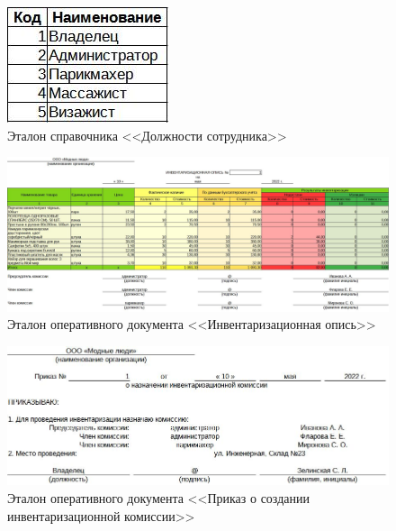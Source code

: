 \documentclass[12pt, a4paper, simple]{eskdtext}
\begin{document}
    \begin{figure}[!h]
        \centering
        \includegraphics[]
            {_docs/СП_ДолжнСотр_эталон.jpg}
        \caption{Эталон справочника <<Должности сотрудника>>}
        \label{fig:CP_DoljSotr_etalon}
    \end{figure}

    \begin{figure}[!h]
        \centering
        \includegraphics[width=18cm]
            {_docs/ОП_ИнвенОпис_эталон.jpg}
        \caption{Эталон оперативного документа <<Инвентаризационная опись>>}
        \label{fig:OP_InvenOpis_etalon}
    \end{figure}

    \begin{figure}[!h]
        \centering
        \includegraphics[width=18cm]
            {_docs/ОП_ПриказСоздКомИнвент_эталон.jpg}
        \caption{Эталон оперативного документа <<Приказ о создании инвентаризационной комиссии>>}
        \label{fig:OP_PrikazSozdKomInvest_etalon}
    \end{figure}
\end{document}
